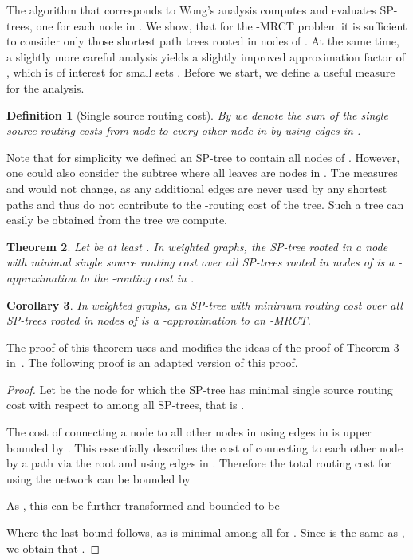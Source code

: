 \documentclass[11pt]{article}
\newtheorem{theorem}{Theorem}[section]
\newtheorem{corollary}[theorem]{Corollary}
\newtheorem{definition}[theorem]{Definition}
\begin{document}
The algorithm that corresponds to Wong's analysis computes and evaluates  SP-trees, one for each node in . We show, that for the -MRCT problem it is sufficient to consider only those shortest path trees rooted in nodes of . At the same time, a slightly more careful analysis yields a slightly improved approximation factor of , which is of interest for small sets . Before we start, we define a useful measure for the analysis.
\begin{definition}[Single source routing cost]
By  we denote the sum of the single source routing costs from node  to every other node in  by using edges in .
\end{definition}
Note that for simplicity we defined an SP-tree to contain all nodes of . However, one could also consider the subtree where all leaves are nodes in . The measures  and  would not change, as any additional edges are never used by any shortest paths and thus do not contribute to the -routing cost of the tree. Such a tree can easily be obtained from the tree we compute.
\begin{theorem}\label{thm:det-ana}
Let  be at least . In weighted graphs, the SP-tree  rooted in a node  with minimal single source routing cost  over all SP-trees rooted in nodes of  is a -approximation to the -routing cost  in .
\end{theorem}
\begin{corollary}\label{cor:improved}
In weighted graphs, an SP-tree with minimum routing cost over all SP-trees rooted in nodes of  is a -approximation to an -MRCT.
\end{corollary}
The proof of this theorem uses and modifies the ideas of the proof of Theorem 3 in~\cite{wong1980worst}. The following proof is an adapted version of this proof. 

\begin{proof}
Let  be the node for which the SP-tree  has minimal single source routing cost with respect to  among all SP-trees, that is . 

The cost of connecting a node  to all other nodes in  using edges in  is upper bounded by . This essentially describes the cost of connecting  to each other node by a path via the root  and using edges in . Therefore the total routing cost  for  using the network  can be bounded by

As , this can be further transformed and bounded to be 

Where the last bound follows, as  is minimal among all  for . Since  is the same as , we obtain that .
\end{proof}
\end{document}
